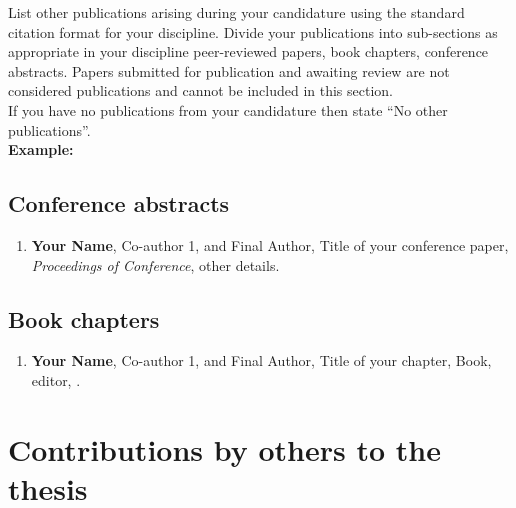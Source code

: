 \begin{instructional}
    List other publications arising during your candidature using the standard citation format for your discipline. Divide your publications into sub-sections as appropriate in your discipline \eg{} peer-reviewed papers, book chapters, conference abstracts. Papers submitted for publication and awaiting review are not considered publications and cannot be included in this section.\\
    
    \noindent
    If you have no publications from your candidature then state ``No other publications''.\\
    
    \textbf{Example:}
    \subsection*{Conference abstracts}

    \begin{enumerate}

    \item \cite{DumyCitationKey} \textbf{Your Name}, Co-author 1, and Final Author, Title of your conference paper, \textit{Proceedings of Conference}, other details.

    \end{enumerate}

    \subsection*{Book chapters}

    \begin{enumerate}

    \item \cite{DumyCitationKey} \textbf{Your Name}, Co-author 1, and Final Author, Title of your chapter, Book, editor, \etc{}.

    \end{enumerate}

\end{instructional}





\section*{Contributions by others to the thesis}

